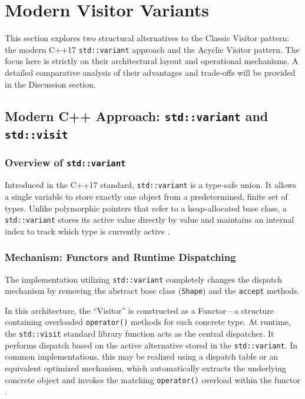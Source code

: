 \section{Modern Visitor Variants}
\label{sec:modern_variants}

This section explores two structural alternatives to the Classic Visitor pattern: the modern C++17 \texttt{std::variant} approach and the Acyclic Visitor pattern. The focus here is strictly on their architectural layout and operational mechanisms. A detailed comparative analysis of their advantages and trade-offs will be provided in the Discussion section.

\subsection{Modern C++ Approach: \texttt{std::variant} and \texttt{std::visit}}

\subsubsection{Overview of \texttt{std::variant}}
Introduced in the C++17 standard, \texttt{std::variant} is a type-safe union. It allows a single variable to store exactly one object from a predetermined, finite set of types. Unlike polymorphic pointers that refer to a heap-allocated base class, a \texttt{std::variant} stores its active value directly by value and maintains an internal index to track which type is currently active \cite{cpprefvariant}.

\subsubsection{Mechanism: Functors and Runtime Dispatching}
The implementation utilizing \texttt{std::variant} completely changes the dispatch mechanism by removing the abstract base class (\texttt{Shape}) and the \texttt{accept} methods. 

In this architecture, the ``Visitor'' is constructed as a Functor---a structure containing overloaded \texttt{operator()} methods for each concrete type. At runtime, the \texttt{std::visit} standard library function acts as the central dispatcher. It performs dispatch based on the active alternative stored in the \texttt{std::variant}. In common implementations, this may be realized using a dispatch table or an equivalent optimized mechanism, which automatically extracts the underlying concrete object and invokes the matching \texttt{operator()} overload within the functor \cite{cpprefvisit}.

